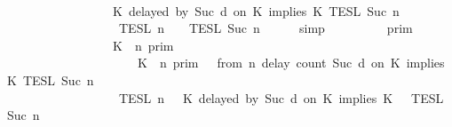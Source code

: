 \begin{isabellebody}
\ \ \ \ \ \ \ \ \ \ \ \ \ \ \ \ \ \ {\isacharparenright}\isanewline
\ \ \ \ \ \ \ \ \ \ \ \ \ \ \ \ {\isasyminter}\ {\isasymlbrakk}\ K\ delayed\ by\ {\isacharparenleft}Suc\ d{\isacharparenright}\ on\ K\ implies\ K\ {\isasymrbrakk}\isactrlsub T\isactrlsub E\isactrlsub S\isactrlsub L\isactrlbsup {\isasymge}\ Suc\ n\isactrlesup \isanewline
\ \ \ \ \ \ \ \ \ \ \ \ \ \ \ \ {\isasyminter}\ {\isasymlbrakk}{\isasymlbrakk}\ {\isasymPsi}\ {\isasymrbrakk}{\isasymrbrakk}\isactrlsub T\isactrlsub E\isactrlsub S\isactrlsub L\isactrlbsup {\isasymge}\ n\isactrlesup \ {\isasyminter}\ {\isasymlbrakk}{\isasymlbrakk}\ {\isasymPhi}\ {\isasymrbrakk}{\isasymrbrakk}\isactrlsub T\isactrlsub E\isactrlsub S\isactrlsub L\isactrlbsup {\isasymge}\ Suc\ n\isactrlesup {\isacartoucheclose}\isanewline
\ \ \ \ \isamarkupfalse%
\ simp\isanewline
\ \ \isamarkupfalse%
\ \isamarkupfalse%
\ {\isacartoucheopen}{\isachardot}{\isachardot}{\isachardot}\ {\isacharequal}\ {\isasymlbrakk}{\isasymlbrakk}\ {\isasymGamma}\ {\isasymrbrakk}{\isasymrbrakk}\isactrlsub p\isactrlsub r\isactrlsub i\isactrlsub m\ \isanewline
\ \ \ \ \ \ \ \ \ \ \ \ \ \ \ \ {\isasyminter}\ {\isacharparenleft}{\isasymlbrakk}\ K\ {\isasymnot}{\isasymUp}\ n\ {\isasymrbrakk}\isactrlsub p\isactrlsub r\isactrlsub i\isactrlsub m\isanewline
\ \ \ \ \ \ \ \ \ \ \ \ \ \ \ \ \ \ \ \ {\isasymunion}\ {\isacharparenleft}{\isasymlbrakk}\ K\ {\isasymUp}\ n\ {\isasymrbrakk}\isactrlsub p\isactrlsub r\isactrlsub i\isactrlsub m\ {\isasyminter}\ {\isasymlbrakk}\ from\ n\ delay\ count\ {\isacharparenleft}Suc\ d{\isacharparenright}\ on\ K\ implies\ K\ {\isasymrbrakk}\isactrlsub T\isactrlsub E\isactrlsub S\isactrlsub L\isactrlbsup {\isasymge}\ Suc\ n\isactrlesup {\isacharparenright}\isanewline
\ \ \ \ \ \ \ \ \ \ \ \ \ \ \ \ \ \ {\isacharparenright}\isanewline
\ \ \ \ \ \ \ \ \ \ \ \ \ \ \ \ {\isasyminter}\ {\isasymlbrakk}{\isasymlbrakk}\ {\isasymPsi}\ {\isasymrbrakk}{\isasymrbrakk}\isactrlsub T\isactrlsub E\isactrlsub S\isactrlsub L\isactrlbsup {\isasymge}\ n\isactrlesup \ {\isasyminter}\ {\isasymlbrakk}{\isasymlbrakk}\ {\isacharparenleft}K\ delayed\ by\ {\isacharparenleft}Suc\ d{\isacharparenright}\ on\ K\ implies\ K\ {\isacharhash}\ {\isasymPhi}\ {\isasymrbrakk}{\isasymrbrakk}\isactrlsub T\isactrlsub E\isactrlsub S\isactrlsub L\isactrlbsup {\isasymge}\ Suc\ n\isactrlesup {\isacartoucheclose}\isanewline

\end{isabellebody}
